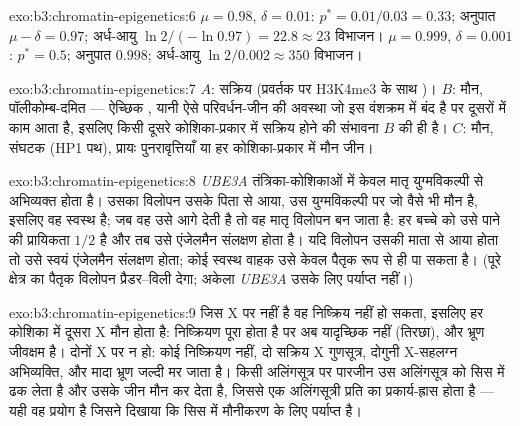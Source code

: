 \begin{solution}{exo:b3:chromatin-epigenetics:6}
$\mu = 0.98$, $\delta = 0.01$: $p^{*} = 0.01/0.03 = 0.33$; अनुपात $\mu -
\delta = 0.97$; अर्ध-आयु $\ln 2/(-\ln 0.97) = 22.8 \approx 23$
विभाजन। $\mu = 0.999$, $\delta = 0.001$: $p^{*} = 0.5$; अनुपात
$0.998$; अर्ध-आयु $\ln 2 / 0.002 \approx 350$ विभाजन।
\end{solution}

\begin{solution}{exo:b3:chromatin-epigenetics:7}
$A$: सक्रिय (प्रवर्तक पर H3K4me3 के साथ )। $B$: मौन,
पॉलीकोम्ब-दमित --- ऐच्छिक , यानी ऐसे परिवर्धन-जीन की
अवस्था जो इस वंशक्रम में बंद है पर दूसरों में काम आता है, इसलिए किसी
दूसरे कोशिका-प्रकार में सक्रिय होने की संभावना $B$ की ही है। $C$: मौन,
संघटक  (HP1 पथ), प्रायः पुनरावृत्तियाँ या हर
कोशिका-प्रकार में मौन जीन।
\end{solution}

\begin{solution}{exo:b3:chromatin-epigenetics:8}
\emph{UBE3A} तंत्रिका-कोशिकाओं में केवल मातृ युग्मविकल्पी से अभिव्यक्त
होता है। उसका विलोपन उसके पिता से आया, उस युग्मविकल्पी पर जो वैसे भी
मौन है, इसलिए वह स्वस्थ है; जब वह उसे आगे देती है तो वह मातृ विलोपन बन
जाता है: हर बच्चे को उसे पाने की प्रायिकता $1/2$ है और तब उसे एंजेलमैन
संलक्षण होता है। यदि विलोपन उसकी माता से आया होता तो उसे स्वयं एंजेलमैन
संलक्षण होता; कोई स्वस्थ वाहक उसे केवल पैतृक रूप से ही पा सकता है।
(पूरे क्षेत्र का पैतृक विलोपन प्रैडर--विली देगा; अकेला \emph{UBE3A}
उसके लिए पर्याप्त नहीं।)
\end{solution}

\begin{solution}{exo:b3:chromatin-epigenetics:9}
जिस X पर \emph{} नहीं है वह निष्क्रिय नहीं हो सकता, इसलिए हर कोशिका
में दूसरा X मौन होता है: निष्क्रियण पूरा होता है पर अब यादृच्छिक नहीं
(तिरछा), और भ्रूण जीवक्षम है। दोनों X पर \emph{} न हो: कोई
निष्क्रियण नहीं, दो सक्रिय X गुणसूत्र, दोगुनी X-सहलग्न अभिव्यक्ति, और
मादा भ्रूण जल्दी मर जाता है। किसी अलिंगसूत्र पर \emph{} पारजीन उस
अलिंगसूत्र को सिस में ढक लेता है और उसके जीन मौन कर देता है, जिससे एक
अलिंगसूत्री प्रति का प्रकार्य-ह्रास होता है --- यही वह प्रयोग है जिसने
दिखाया कि \emph{} सिस में मौनीकरण के लिए पर्याप्त है।
\end{solution}

